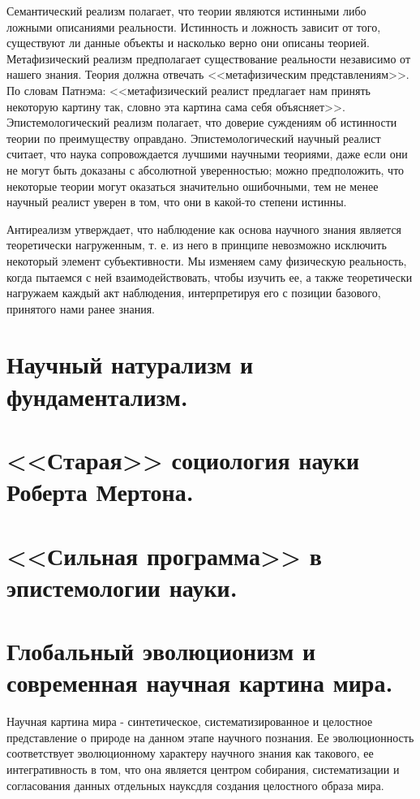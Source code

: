 \documentclass[12pt, specialist, subf, substylefile = spbu.rtx]{disser}
\begin{document}
Семантический реализм полагает, что теории являются истинными либо ложными описаниями реальности. Истинность и ложность зависит от того, существуют ли данные объекты и насколько верно они описаны теорией.
Метафизический реализм предполагает существование реальности независимо от нашего знания. Теория должна отвечать <<метафизическим представлениям>>. По словам Патнэма: <<метафизический реалист предлагает нам принять некоторую картину так, словно эта картина сама себя объясняет>>.
Эпистемологический реализм полагает, что доверие суждениям об истинности теории по преимуществу оправдано. Эпистемологический научный реалист считает, что наука сопровождается лучшими научными теориями, даже если они не могут быть доказаны с абсолютной уверенностью; можно предположить, что некоторые теории могут оказаться значительно ошибочными, тем не менее научный реалист уверен в том, что они в какой-то степени истинны.

Антиреализм утверждает, что наблюдение как основа научного знания является теоретически нагруженным, т. е. из него в принципе невозможно исключить некоторый элемент субъективности. Мы изменяем саму физическую реальность, когда пытаемся с ней взаимодействовать, чтобы изучить ее, а также теоретически нагружаем каждый акт наблюдения, интерпретируя его с позиции базового, принятого нами ранее знания.

\section{Научный натурализм и фундаментализм.}

\section{<<Старая>> социология науки Роберта Мертона.}

\section{<<Сильная программа>> в эпистемологии науки.}

\section{Глобальный эволюционизм и современная научная картина мира.}
Научная картина мира - синтетическое, систематизированное и целостное представление о природе на данном этапе научного познания. Ее эволюционность соответствует эволюционному характеру научного знания как такового, ее интегративность в том, что она является центром собирания, систематизации и согласования данных отдельных науксдля создания целостного образа мира.
\end{document}
